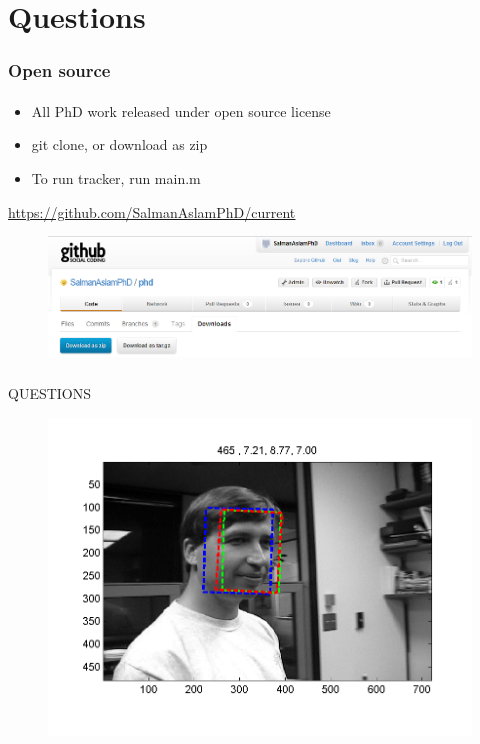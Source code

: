 \section{Questions}
\begin{frame}
\frametitle{Open source}
\framesubtitle{}
\logoCSIPCPL\mypagenum
\setcounter{subfigure}{0}
\begin{itemize}
\item All PhD work released under open source license
\item git clone, or download as zip
\item To run tracker, run main.m
\end{itemize}
\vspace{0.3in}
\color{blue}\underline{\url{https://github.com/SalmanAslamPhD/current}}
\begin{figure}
\includegraphics[width=1.0\textwidth]{thesis/github.png}
\end{figure}
\end{frame}

\begin{frame}
\frametitle{}
\logoCSIPCPL\mypagenum
		QUESTIONS
\begin{figure}
\includegraphics[width=1.0\textwidth]{thesis/00465.png}
\end{figure}

\end{frame}



